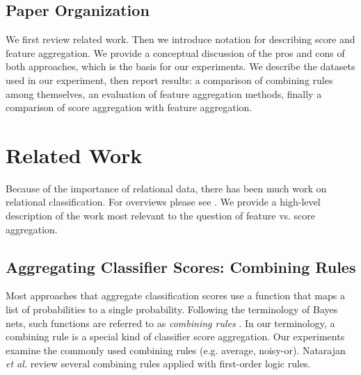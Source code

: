 \documentclass[conference]{IEEEtran}
\begin{document}
\subsection{Paper Organization} We first review related work. Then we introduce notation for describing score and feature aggregation. We provide a conceptual discussion of the pros and cons of both approaches, which is the basis for our experiments. We describe the datasets used in our experiment, then report results: a comparison of combining rules among themselves, an evaluation of feature aggregation methods, finally a comparison of score aggregation with feature aggregation.

\section{Related Work}
Because of the importance of relational data, there has been much work on relational classification. For overviews please see \cite{han2009,Bina2012}. We provide a high-level description of the work most relevant to the question of feature vs. score aggregation.

\subsection{Aggregating Classifier Scores: Combining Rules} Most approaches that aggregate classification scores use a function that maps a list of probabilities to a single probability. Following the terminology of Bayes nets, such functions are referred to as {\em combining rules} \cite{Pearl1988,Kersting2007}. In our terminology, a combining rule is a special kind of classifier score aggregation. Our experiments examine the commonly used combining rules (e.g. average, noisy-or). Natarajan {\em et al.} \cite{Natarajan2008} review several combining rules applied with first-order logic rules.
\end{document}
